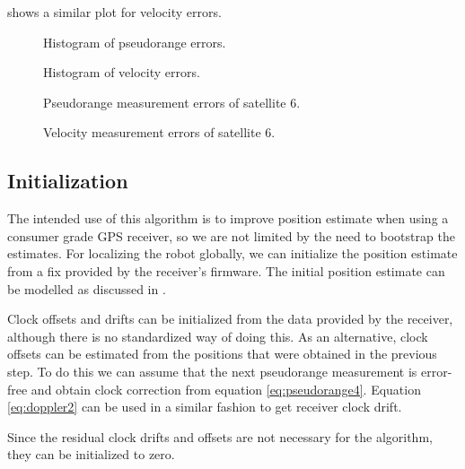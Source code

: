  shows a similar plot for velocity errors.

\begin{figure}[p]
	\centering
	\noindent{}
	\caption{Histogram of pseudorange errors.}
	\label{fig:pseudorange-hist}
\end{figure}

\begin{figure}[p]
	\centering
	\noindent{}
	\caption{Histogram of velocity errors.}
	\label{fig:velocity-hist}
\end{figure}

\begin{figure}[p]
	\centering
	\noindent{}
	\caption{Pseudorange measurement errors of satellite 6.}
	\label{fig:pseudorange-errors}
\end{figure}

\begin{figure}[p]
	\centering
	\noindent{}
	\caption{Velocity measurement errors of satellite 6.}
	\label{fig:velocity-errors}
\end{figure}


\subsection{Initialization}
The intended use of this algorithm is to improve position estimate when using
a consumer grade GPS receiver, so we are not limited by the need to bootstrap the estimates.
For localizing the robot globally, we can initialize the position
estimate from a fix provided by the receiver's firmware.
The initial position estimate can be modelled as discussed in .

Clock offsets and drifts can be initialized from the data provided by the
receiver, although there is no standardized way of doing this.
As an alternative, clock offsets can be estimated from the positions that were obtained in
the previous step.
To do this we can assume that the next pseudorange measurement is error-free
and obtain clock correction from equation \eqref{eq:pseudorange4}.
Equation \eqref{eq:doppler2} can be used in a similar fashion to get receiver clock drift.

Since the residual clock drifts and offsets are not necessary for the algorithm,
they can be initialized to zero.

